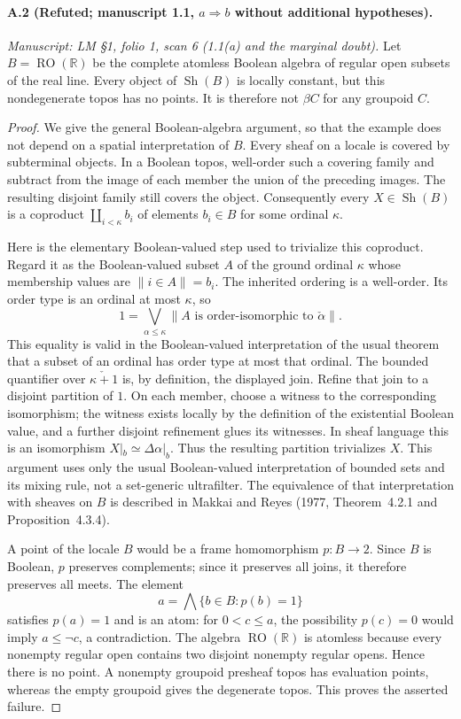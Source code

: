 \paragraph{A.2 (Refuted; manuscript 1.1, $a\Rightarrow b$ without additional hypotheses).}
\textit{Manuscript: LM \S1, folio 1, scan 6 (1.1(a) and the marginal doubt).}
Let $B=\operatorname{RO}(\mathbb R)$ be the complete atomless Boolean algebra of regular open subsets of the real line. Every object of $\operatorname{Sh}(B)$ is locally constant, but this nondegenerate topos has no points. It is therefore not $\beta C$ for any groupoid $C$.
\begin{proof}
We give the general Boolean-algebra argument, so that the example does not depend on a spatial interpretation of $B$. Every sheaf on a locale is covered by subterminal objects. In a Boolean topos, well-order such a covering family and subtract from the image of each member the union of the preceding images. The resulting disjoint family still covers the object. Consequently every $X\in\operatorname{Sh}(B)$ is a coproduct $\coprod_{i<\kappa} b_i$ of elements $b_i\in B$ for some ordinal $\kappa$.

Here is the elementary Boolean-valued step used to trivialize this coproduct. Regard it as the Boolean-valued subset $A$ of the ground ordinal $\kappa$ whose membership values are $\lVert i\in A\rVert=b_i$. The inherited ordering is a well-order. Its order type is an ordinal at most $\kappa$, so
\[
 1=\bigvee_{\alpha\leq\kappa}
       \lVert A\text{ is order-isomorphic to }\check\alpha\rVert.
\]
This equality is valid in the Boolean-valued interpretation of the usual theorem that a subset of an ordinal has order type at most that ordinal. The bounded quantifier over $\check{\kappa+1}$ is, by definition, the displayed join. Refine that join to a disjoint partition of $1$. On each member, choose a witness to the corresponding isomorphism; the witness exists locally by the definition of the existential Boolean value, and a further disjoint refinement glues its witnesses. In sheaf language this is an isomorphism $X|_b\simeq\Delta\alpha|_b$. Thus the resulting partition trivializes $X$. This argument uses only the usual Boolean-valued interpretation of bounded sets and its mixing rule, not a set-generic ultrafilter. The equivalence of that interpretation with sheaves on $B$ is described in Makkai and Reyes (1977, Theorem~4.2.1 and Proposition~4.3.4).

A point of the locale $B$ would be a frame homomorphism $p:B\to2$. Since $B$ is Boolean, $p$ preserves complements; since it preserves all joins, it therefore preserves all meets. The element
\[
 a=\bigwedge\{b\in B:p(b)=1\}
\]
satisfies $p(a)=1$ and is an atom: for $0<c\leq a$, the possibility $p(c)=0$ would imply $a\leq\neg c$, a contradiction. The algebra $\operatorname{RO}(\mathbb R)$ is atomless because every nonempty regular open contains two disjoint nonempty regular opens. Hence there is no point. A nonempty groupoid presheaf topos has evaluation points, whereas the empty groupoid gives the degenerate topos. This proves the asserted failure. 
\end{proof}

